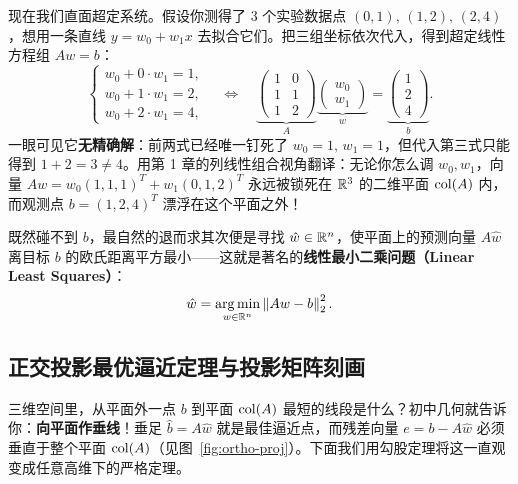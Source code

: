 现在我们直面超定系统。假设你测得了 3 个实验数据点 $(0, 1),\, (1, 2),\, (2, 4)$，想用一条直线 $y = w_0 + w_1 x$ 去拟合它们。把三组坐标依次代入，得到超定线性方程组 $Aw = b$：
\[
\begin{cases}
w_0 + 0\cdot w_1 = 1, \\
w_0 + 1\cdot w_1 = 2, \\
w_0 + 2\cdot w_1 = 4,
\end{cases}
\quad \Longleftrightarrow \quad
\underbrace{\begin{pmatrix} 1 & 0 \\ 1 & 1 \\ 1 & 2 \end{pmatrix}}_{A}
\underbrace{\begin{pmatrix} w_0 \\ w_1 \end{pmatrix}}_{w}
=
\underbrace{\begin{pmatrix} 1 \\ 2 \\ 4 \end{pmatrix}}_{b}.
\]
一眼可见它\textbf{无精确解}：前两式已经唯一钉死了 $w_0 = 1,\, w_1 = 1$，但代入第三式只能得到 $1 + 2 = 3 \neq 4$。用第 1 章的列线性组合视角翻译：无论你怎么调 $w_0, w_1$，向量 $Aw = w_0 (1,1,1)^T + w_1 (0,1,2)^T$ 永远被锁死在 $\mathbb{R}^3$ 的二维平面 $\operatorname{col}(A)$ 内，而观测点 $b = (1, 2, 4)^T$ 漂浮在这个平面之外！

既然碰不到 $b$，最自然的退而求其次便是寻找 $\hat{w} \in \mathbb{R}^n$，使平面上的预测向量 $A\hat{w}$ 离目标 $b$ 的欧氏距离平方最小——这就是著名的\textbf{线性最小二乘问题（Linear Least Squares）}：
\begin{equation}\label{eq:ls-obj}
\hat{w} = \operatorname*{arg\,min}_{w \in \mathbb{R}^n} \left\|Aw - b\right\|_2^2.
\end{equation}

\subsection{正交投影最优逼近定理与投影矩阵刻画}

三维空间里，从平面外一点 $b$ 到平面 $\operatorname{col}(A)$ 最短的线段是什么？初中几何就告诉你：\textbf{向平面作垂线}！垂足 $\hat{b} = A\hat{w}$ 就是最佳逼近点，而残差向量 $e = b - A\hat{w}$ 必须垂直于整个平面 $\operatorname{col}(A)$（见图~\ref{fig:ortho-proj}）。下面我们用勾股定理将这一直观变成任意高维下的严格定理。

